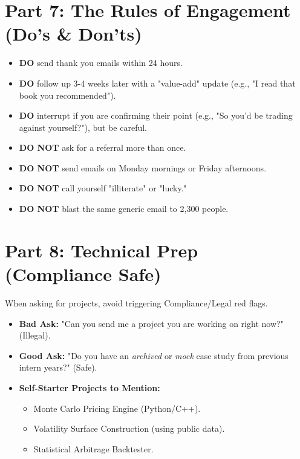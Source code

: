 \documentclass[11pt, a4paper]{article}
\begin{document}
\section{Part 7: The Rules of Engagement (Do's \& Don'ts)}

\begin{itemize}
    \item \textbf{DO} send thank you emails within 24 hours.
    \item \textbf{DO} follow up 3-4 weeks later with a "value-add" update (e.g., "I read that book you recommended").
    \item \textbf{DO} interrupt if you are confirming their point (e.g., "So you'd be trading against yourself?"), but be careful.
    \item \textbf{DO NOT} ask for a referral more than once.
    \item \textbf{DO NOT} send emails on Monday mornings or Friday afternoons.
    \item \textbf{DO NOT} call yourself "illiterate" or "lucky."
    \item \textbf{DO NOT} blast the same generic email to 2,300 people.
\end{itemize}

\section{Part 8: Technical Prep (Compliance Safe)}
When asking for projects, avoid triggering Compliance/Legal red flags.
\begin{itemize}
    \item \textbf{Bad Ask:} "Can you send me a project you are working on right now?" (Illegal).
    \item \textbf{Good Ask:} "Do you have an \textit{archived} or \textit{mock} case study from previous intern years?" (Safe).
    \item \textbf{Self-Starter Projects to Mention:}
    \begin{itemize}
        \item Monte Carlo Pricing Engine (Python/C++).
        \item Volatility Surface Construction (using public data).
        \item Statistical Arbitrage Backtester.
    \end{itemize}
\end{itemize}
\end{document}
